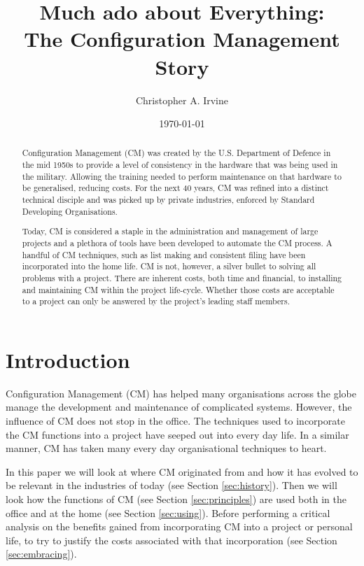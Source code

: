 \documentclass[cmpstyle]{ueacmpstyle}
\begin{document}
	\title{Much ado about Everything: \\ The Configuration Management Story}
	\author{Christopher A. Irvine}
	\date{\today}
	\maketitle
	
	\begin{abstract}
	Configuration Management (CM) was created by the U.S. Department of Defence in the mid 1950s to provide a level of consistency in the hardware that was being used in the military. Allowing the training needed to perform maintenance on that hardware to be generalised, reducing costs. For the next 40 years, CM was refined into a distinct technical disciple and was picked up by private industries, enforced by Standard Developing Organisations. 
	
	Today, CM is considered a staple in the administration and management of large projects and a plethora of tools have been developed to automate the CM process. A handful of CM techniques, such as list making and consistent filing have been incorporated into the home life. CM is not, however, a silver bullet to solving all problems with a project. There are inherent costs, both time and financial, to installing and maintaining CM within the project life-cycle. Whether those costs are acceptable to a project can only be answered by the project's leading staff members. 
	\end{abstract}

	\section{Introduction} \label{sec:intro}
	Configuration Management (CM) has helped many organisations across the globe manage the development and maintenance of complicated systems. However, the influence of CM does not stop in the office. The techniques used to incorporate the CM functions into a project have seeped out into every day life. In a similar manner, CM has taken many every day organisational techniques to heart. 
	
	In this paper we will look at where CM originated from and how it has evolved to be relevant in the industries of today (see Section \ref{sec:history}). Then we will look how the functions of CM (see Section \ref{sec:principles}) are used both in the office and at the home (see Section \ref{sec:using}). Before performing a critical analysis on the benefits gained from incorporating CM into a project or personal life, to try to justify the costs associated with that incorporation (see Section \ref{sec:embracing}). 
	
\end{document}
